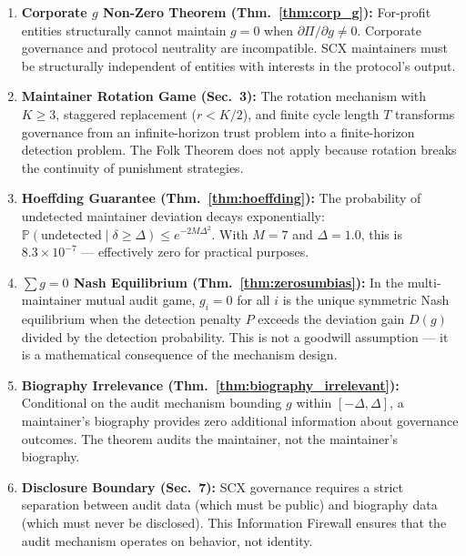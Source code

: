 \documentclass[12pt,a4paper]{article}
\theoremstyle{remark}
\newcommand{\Pbb}{\mathbb{P}}
\begin{document}
\begin{enumerate}[label=(\arabic*), leftmargin=*]
    \item \textbf{Corporate $g$ Non-Zero Theorem (Thm.~\ref{thm:corp_g}):}
          For-profit entities structurally cannot maintain $g = 0$ when
          $\partial \Pi / \partial g \neq 0$. Corporate governance and protocol
          neutrality are incompatible. SCX maintainers must be structurally
          independent of entities with interests in the protocol's output.
    
    \item \textbf{Maintainer Rotation Game (Sec.~3):} The rotation mechanism
          with $K \geq 3$, staggered replacement ($r < K/2$), and finite cycle
          length $T$ transforms governance from an infinite-horizon trust problem
          into a finite-horizon detection problem. The Folk Theorem does not
          apply because rotation breaks the continuity of punishment strategies.
    
    \item \textbf{Hoeffding Guarantee (Thm.~\ref{thm:hoeffding}):} The
          probability of undetected maintainer deviation decays exponentially:
          $\Pbb(\text{undetected} \mid \delta \geq \Delta) \leq e^{-2M\Delta^2}$.
          With $M = 7$ and $\Delta = 1.0$, this is $8.3 \times 10^{-7}$ —
          effectively zero for practical purposes.
    
    \item \textbf{$\sum g = 0$ Nash Equilibrium (Thm.~\ref{thm:zerosumbias}):}
          In the multi-maintainer mutual audit game, $g_i = 0$ for all $i$ is
          the unique symmetric Nash equilibrium when the detection penalty $P$
          exceeds the deviation gain $D(g)$ divided by the detection probability.
          This is not a goodwill assumption — it is a mathematical consequence
          of the mechanism design.
    
    \item \textbf{Biography Irrelevance (Thm.~\ref{thm:biography_irrelevant}):}
          Conditional on the audit mechanism bounding $g$ within $[-\Delta, \Delta]$,
          a maintainer's biography provides zero additional information about
          governance outcomes. The theorem audits the maintainer, not the
          maintainer's biography.
    
    \item \textbf{Disclosure Boundary (Sec.~7):} SCX governance requires a strict
          separation between audit data (which must be public) and biography data
          (which must never be disclosed). This Information Firewall ensures that
          the audit mechanism operates on behavior, not identity.
\end{enumerate}
\end{document}
